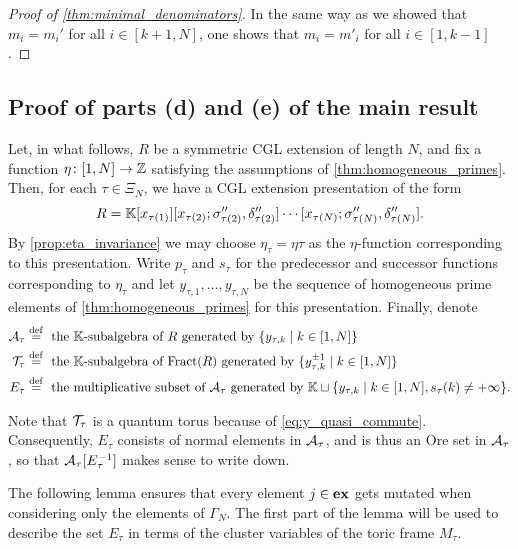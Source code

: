 \begin{proof}[Proof of \cref{thm:minimal_denominators}]
	In the same way as we showed that $m_i = m_i'$ for all $i \in [k+1, N]$, one shows that
	$m_i = m'_i$ for all $i \in [1, k-1]$.
\end{proof}

\subsection{Proof of parts (d) and (e) of the main result}

Let, in what follows, $R$ be a symmetric CGL extension of length $N$, and fix a
function $\eta \colon [1, N] \to \mathbb{Z}$ satisfying the assumptions of
\cref{thm:homogeneous_primes}. Then, for each $\tau \in \Xi_N$, we have a CGL extension
presentation of the form
\begin{equation*}
	R = \mathbb{K}[x_{\tau(1)}][x_{\tau(2)}; \sigma''_{\tau(2)}, \delta''_{\tau(2)}] \cdots [x_{\tau(N)}; \sigma''_{\tau(N)}, \delta''_{\tau(N)}].
\end{equation*}
%
By \cref{prop:eta_invariance} we may choose $\eta_\tau = \eta\tau$ as the
$\eta$-function corresponding to this presentation. Write $p_\tau$ and $s_\tau$ for the
predecessor and successor functions corresponding to $\eta_\tau$ and let $y_{\tau, 1},
	\dots, y_{\tau, N}$ be the sequence of homogeneous prime elements of
\cref{thm:homogeneous_primes} for this presentation. Finally, denote
\begin{align*}
	\mathcal{A}_\tau & \overset{\mathrm{def}}{=} \text{ the $\mathbb{K}$-subalgebra of $R$ generated by } \{y_{\tau, k} \mid k \in [1, N]\}                                                   \\
	\mathcal{T}_\tau & \overset{\mathrm{def}}{=} \text{ the $\mathbb{K}$-subalgebra of $\operatorname{Fract}(R)$ generated by } \{y_{\tau, k}^{\pm 1} \mid k \in [1, N]\}                                   \\
	E_\tau    & \overset{\mathrm{def}}{=} \text{ the multiplicative subset of $\mathcal{A}_\tau$ generated by } \mathbb{K} \sqcup \{y_{\tau, k} \mid k \in [1, N], s_\tau(k) \neq + \infty\}.
\end{align*}

Note that $\mathcal{T}_\tau$ is a quantum torus because of \cref{eq:y_quasi_commute}.
Consequently, $E_\tau$ consists of normal elements in $\mathcal{A}_\tau$, and is thus an Ore
set in $\mathcal{A}_\tau$, so that $\mathcal{A}_\tau[E^{-1}_\tau]$ makes sense to write down.

The following lemma ensures that every element $j \in \mathbf{ex}$ gets mutated when
considering only the elements of $\Gamma_N$. The first part of the lemma will be used
to describe the set $E_\tau$ in terms of the cluster variables of the toric frame
$M_\tau$.

